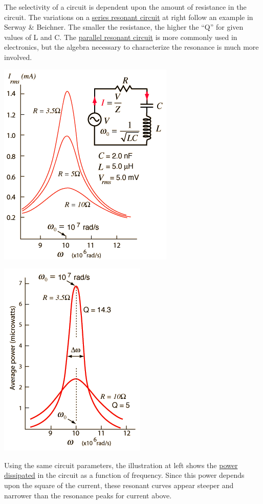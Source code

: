 The selectivity of a circuit is dependent upon the amount of resistance
in the circuit. The variations on a
\href{http://hyperphysics.phy-astr.gsu.edu/hbase/electric/serres.html\#c2}{series
resonant circuit} at right follow an example in Serway \& Beichner. The
smaller the resistance, the higher the ``Q'' for given values of L and
C. The
\href{http://hyperphysics.phy-astr.gsu.edu/hbase/electric/parres.html\#c1}{parallel
resonant circuit} is more commonly used in electronics, but the algebra
necessary to characterize the resonance is much more involved.\strut
\includegraphics{./resonant-rlc-circuits_files/qresi.png}\strut

\includegraphics{./resonant-rlc-circuits_files/qpow.png}\strut
Using the same circuit parameters, the illustration at left shows the
\href{http://hyperphysics.phy-astr.gsu.edu/hbase/electric/serres.html\#c4}{power
dissipated} in the circuit as a function of frequency. Since this power
depends upon the square of the current, these resonant curves appear
steeper and narrower than the resonance peaks for current above.

